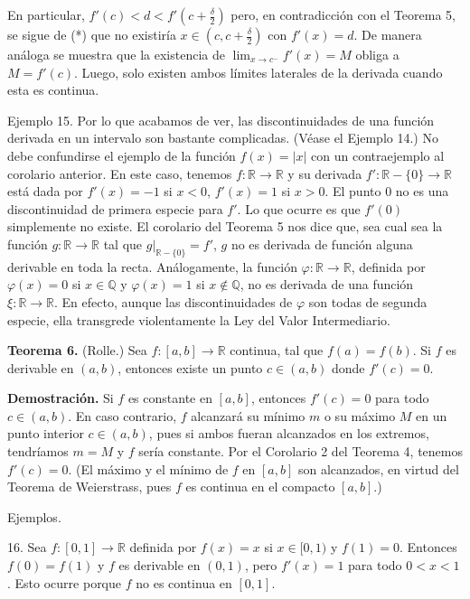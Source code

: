 \documentclass[12pt,oneside]{book}
\begin{document}
En particular, \( f'(c) < d < f'\left( c + \frac{\delta}{2} \right) \) pero, en contradicción con el Teorema 5, se sigue de (*) que no existiría \( x \in \left( c, c + \frac{\delta}{2} \right) \) con \( f'(x) = d \). De manera análoga se muestra que la existencia de \( \lim_{x \to c^-} f'(x) = M \) obliga a \( M = f'(c) \). Luego, solo existen ambos límites laterales de la derivada cuando esta es continua.

Ejemplo 15. Por lo que acabamos de ver, las discontinuidades de una función derivada en un intervalo son bastante complicadas. (Véase el Ejemplo 14.) No debe confundirse el ejemplo de la función \( f(x) = |x| \) con un contraejemplo al corolario anterior. En este caso, tenemos \( f: \mathbb{R} \to \mathbb{R} \) y su derivada \( f': \mathbb{R} - \{0\} \to \mathbb{R} \) está dada por \( f'(x) = -1 \) si \( x < 0 \), \( f'(x) = 1 \) si \( x > 0 \). El punto \( 0 \) no es una discontinuidad de primera especie para \( f' \). Lo que ocurre es que \( f'(0) \) simplemente no existe. El corolario del Teorema 5 nos dice que, sea cual sea la función \( g: \mathbb{R} \to \mathbb{R} \) tal que \( g|_{\mathbb{R} - \{0\}} = f' \), \( g \) no es derivada de función alguna derivable en toda la recta. Análogamente, la función \( \varphi: \mathbb{R} \to \mathbb{R} \), definida por \( \varphi(x) = 0 \) si \( x \in \mathbb{Q} \) y \( \varphi(x) = 1 \) si \( x \notin \mathbb{Q} \), no es derivada de una función \( \xi: \mathbb{R} \to \mathbb{R} \). En efecto, aunque las discontinuidades de \( \varphi \) son todas de segunda especie, ella transgrede violentamente la Ley del Valor Intermediario.

\textbf{Teorema 6.} (Rolle.) Sea \( f: [a, b] \to \mathbb{R} \) continua, tal que \( f(a) = f(b) \). Si \( f \) es derivable en \( (a, b) \), entonces existe un punto \( c \in (a, b) \) donde \( f'(c) = 0 \).

\textbf{Demostración.} Si \( f \) es constante en \( [a, b] \), entonces \( f'(c) = 0 \) para todo \( c \in (a, b) \). En caso contrario, \( f \) alcanzará su mínimo \( m \) o su máximo \( M \) en un punto interior \( c \in (a, b) \), pues si ambos fueran alcanzados en los extremos, tendríamos \( m = M \) y \( f \) sería constante. Por el Corolario 2 del Teorema 4, tenemos \( f'(c) = 0 \). (El máximo y el mínimo de \( f \) en \( [a, b] \) son alcanzados, en virtud del Teorema de Weierstrass, pues \( f \) es continua en el compacto \( [a, b] \).)

Ejemplos.

16. Sea \( f: [0, 1] \to \mathbb{R} \) definida por \( f(x) = x \) si \( x \in [0, 1) \) y \( f(1) = 0 \). Entonces \( f(0) = f(1) \) y \( f \) es derivable en \( (0, 1) \), pero \( f'(x) = 1 \) para todo \( 0 < x < 1 \). Esto ocurre porque \( f \) no es continua en \( [0, 1] \).
\end{document}
